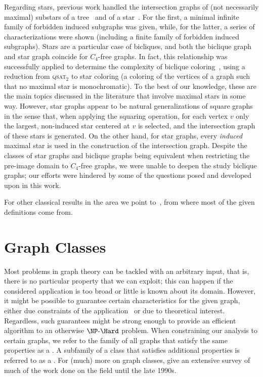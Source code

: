 Regarding stars, previous work handled the intersection graphs of (not necessarily maximal) substars of a tree~\citep{substar_graph} and of a star~\citep{starlike_graph}.
For the first, a minimal infinite family of forbidden induced subgraphs was given, while, for the latter, a series of characterizations were shown (including a finite family of forbidden induced subgraphs).
Stars are a particular case of bicliques, and both the biclique graph and star graph coincide for $C_4$-free graphs.
In fact, this relationship was successfully applied to determine the complexity of biclique coloring~\citep{biclique_coloring_complexity}, using a reduction from \textsc{qsat}$_2$ to star coloring (a coloring of the vertices of a graph such that no maximal star is monochromatic).
To the best of our knowledge, these are the main topics discussed in the literature that involve maximal stars in some way.
However, star graphs appear to be natural generalizations of square graphs~\cite{murty} in the sense that, when applying the squaring operation, for each vertex $v$ only the largest, non-induced star centered at $v$ is selected, and the intersection graph of these stars is generated.
On the other hand, for star graphs, every \textit{induced} maximal star is used in the construction of the intersection graph.
Despite the classes of star graphs and biclique graphs being equivalent when restricting the  pre-image domain to $C_4$-free graphs, we were unable to deepen the study biclique graphs; our efforts were hindered by some of the questions posed and developed upon in this work.


For other classical results in the area we point to~\citep{intersection_graphs}, from where most of the given definitions come from.

\section{Graph Classes}
\label{sec:graph_classes}

Most problems in graph theory can be tackled with an arbitrary input, that is, there is no particular property that we can exploit; this can happen if the considered application is too broad or little is known about its domain.
However, it might be possible to guarantee certain characteristics for the given graph, either due constraints of the application~\citep{fernando_chordal} or due to theoretical interest.
Regardless, such guarantees might be strong enough to provide an efficient algorithm to an otherwise $\NPH$ problem.
When constraining our analysis to certain graphs, we refer to the family of all graphs that satisfy the same properties as a .
A subfamily of a class that satisfies additional properties is referred to as a .
For (much) more on graph classes, \citep{classes_survey} give an extensive survey of much of the work done on the field until the late 1990s.

